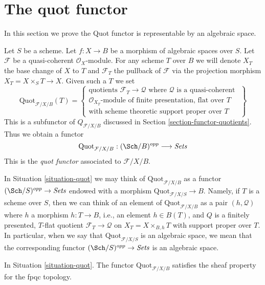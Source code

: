 \section{The quot functor}
\label{section-quot}

\noindent
In this section we prove the Quot functor is representable by
an algebraic space.

\begin{situation}
\label{situation-quot}
Let $S$ be a scheme. Let $f : X \to B$ be a morphism of
algebraic spaces  over $S$. Let $\mathcal{F}$ be a quasi-coherent
$\mathcal{O}_X$-module.
For any scheme $T$ over $B$ we will denote $X_T$ the base change of
$X$ to $T$ and $\mathcal{F}_T$ the pullback
of $\mathcal{F}$ via the projection morphism $X_T = X \times_S T \to X$.
Given such a $T$ we set
$$
\text{Quot}_{\mathcal{F}/X/B}(T) =
\left\{
\begin{matrix}
\text{quotients }\mathcal{F}_T \to \mathcal{Q}\text{ where }
\mathcal{Q}\text{ is a quasi-coherent }\\
\mathcal{O}_{X_T}\text{-module of finite presentation, flat over }T\\
\text{with scheme theoretic support proper over }T
\end{matrix}
\right\}
$$
This is a subfunctor of $Q_{\mathcal{F}/X/B}$ discussed in
Section \ref{section-functor-quotients}. Thus we obtain a functor
\begin{equation}
\label{equation-quot}
\text{Quot}_{\mathcal{F}/X/B} : (\Sch/B)^{opp} \longrightarrow \textit{Sets}
\end{equation}
This is the {\it quot functor} associated to $\mathcal{F}/X/B$.
\end{situation}

\noindent
In Situation \ref{situation-quot} we may think of
$\text{Quot}_{\mathcal{F}/X/B}$ as a functor
$(\Sch/S)^{opp} \to \textit{Sets}$ endowed
with a morphism $\text{Quot}_{\mathcal{F}/X/S} \to B$.
Namely, if $T$ is a scheme over $S$, then we can think of an element
of $\text{Quot}_{\mathcal{F}/X/B}$ as a pair $(h, \mathcal{Q})$
where $h$ a morphism $h : T \to B$, i.e., an element $h \in B(T)$,
and $Q$ is a finitely presented, $T$-flat quotient
$\mathcal{F}_T \to \mathcal{Q}$ on $X_T = X \times_{B, h} T$
with support proper over $T$. In particular, when we say
that $\text{Quot}_{\mathcal{F}/X/S}$ is an algebraic space, we mean that the
corresponding functor $(\Sch/S)^{opp} \to \textit{Sets}$ is an algebraic space.

\begin{lemma}
\label{lemma-quot-sheaf}
In Situation \ref{situation-quot}. The functor $\text{Quot}_{\mathcal{F}/X/B}$
satisfies the sheaf property for the fpqc topology.
\end{lemma}

